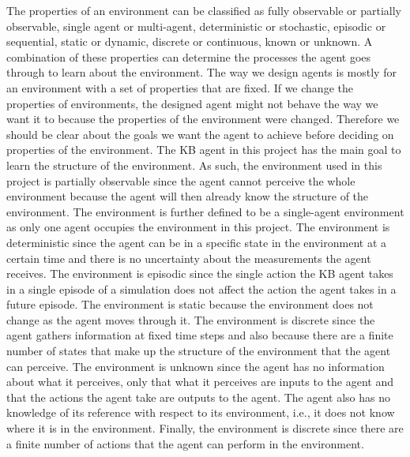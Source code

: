 The properties of an environment can be classified as fully observable or partially observable, single agent or multi-agent, deterministic or stochastic, episodic or sequential, static or dynamic, discrete or continuous, known or unknown. A combination of these properties can determine the processes the agent goes through to learn about the environment. 
The way we design agents is mostly for an environment with a set of properties that are fixed. If we change the properties of environments, the designed agent might not behave the way we want it to because the properties of the environment were changed. Therefore we should be clear about the goals we want the agent to achieve before deciding on properties of the environment. The KB agent in this project has the main goal to learn the structure of the environment. 
As such, the environment used in this project is partially observable since the agent cannot perceive the whole environment because the agent will then already know the structure of the environment. 
The environment is further defined to be a single-agent environment as only one agent occupies the environment in this project. 
The environment is deterministic since the agent can be in a specific state in the environment at a certain time and there is no uncertainty about the measurements the agent receives. 
The environment is episodic since the single action the KB agent takes in a single episode of a simulation does not affect the action the agent takes in a future episode. The environment is static because the environment does not change as the agent moves through it. 
The environment is discrete since the agent gathers information at fixed time steps and also because there are a finite number of states that make up the structure of the environment that the agent can perceive.
The environment is unknown since the agent has no information about what it perceives, only that what it perceives are inputs to the agent and that the actions the agent take are outputs to the agent. The agent also has no knowledge of its reference with respect to its environment, i.e., it does not know where it is in the environment. 
Finally, the environment is discrete since there are a finite number of actions that the agent can perform in the environment.







